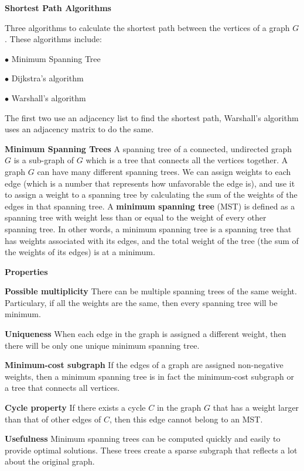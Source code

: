 \filbreak
\vskip 1cm
{\bf Shortest Path Algorithms}

\vskip 1mm
Three algorithms to calculate the shortest path between the vertices of a graph $G$. These algorithms include:

\vskip 3mm
\qquad$\bullet$ Minimum Spanning Tree

\vskip 3mm
\qquad$\bullet$ Dijkstra's algorithm

\vskip 3mm
\qquad$\bullet$ Warshall's algorithm

\vskip 1mm
The first two use an adjacency list to find the shortest path, Warshall's algorithm uses an adjacency matrix to do the same.

\filbreak
\vskip 1cm
{\bf Minimum Spanning Trees}
\vskip 1mm
A spanning tree of a connected, undirected graph $G$ is a sub-graph of $G$ which is a tree that connects all the vertices together. A graph $G$ can have many different spanning trees. We can assign weights to each edge (which is a number that represents how unfavorable the edge is), and use it to assign a weight to a spanning tree by calculating the sum of the weights of the edges in that spanning tree. A {\bf minimum spanning tree} (MST) is defined as a spanning tree with weight less than or equal to the weight of every other spanning tree. In other words, a minimum spanning tree is a spanning tree that has weights associated with its edges, and the total weight of the tree (the sum of the weights of its edges) is at a minimum.

\vskip 3mm
{\bf Properties}

\vskip 1mm
{\bf Possible multiplicity} There can be multiple spanning trees of the same weight. Particulary, if all the weights are the same, then every spanning tree will be minimum.

\vskip 3mm
{\bf Uniqueness} When each edge in the graph is assigned a different weight, then there will be only one unique minimum spanning tree.

\vskip 3mm
{\bf Minimum-cost subgraph} If the edges of a graph are assigned non-negative weights, then a minimum spanning tree is in fact the minimum-cost subgraph or a tree that connects all vertices.

\vskip 3mm
{\bf Cycle property} If there exists a cycle $C$ in the graph $G$ that has a weight larger than that of other edges of $C$, then this edge cannot belong to an MST.

\vskip 3mm
{\bf Usefulness} Minimum spanning trees can be computed quickly and easily to provide optimal solutions. These trees create a sparse subgraph that reflects a lot about the original graph.

